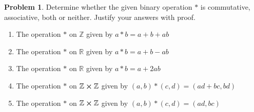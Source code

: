\documentclass[10pt]{article}
\theoremstyle{definition}
\newtheorem{problem}{Problem}
\begin{document}
\begin{problem}
Determine whether the given binary operation $*$ is commutative,
associative, both or neither. Justify your answers with proof.
\begin{enumerate}[label=(\alph*)]
  \item The operation $*$ on $\mathbb{Z}$ given by $a*b=a+b+ab$
  \item The operation $*$ on $\mathbb{R}$ given by $a*b=a+b-ab$
  \item The operation $*$ on $\mathbb{R}$ given by $a*b=a+2ab$
  \item The operation $*$ on $\mathbb{Z}\cross\mathbb{Z}$ given by $(a,b)*(c,d)=(ad+bc, bd)$
  \item The operation $*$ on $\mathbb{Z}\cross\mathbb{Z}$ given by $(a,b)*(c,d)=(ad,bc)$
\end{enumerate}
\end{problem}
\end{document}
